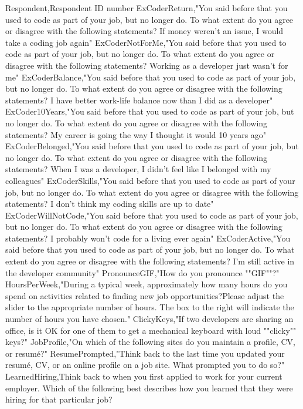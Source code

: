 \begin{appendices}
Respondent,Respondent ID number
ExCoderReturn,"You said before that you used to code as part of your job, but no longer do. To what extent do you agree or disagree with the following statements? If money weren't an issue, I would take a coding job again"
ExCoderNotForMe,"You said before that you used to code as part of your job, but no longer do. To what extent do you agree or disagree with the following statements? Working as a developer just wasn't for me"
ExCoderBalance,"You said before that you used to code as part of your job, but no longer do. To what extent do you agree or disagree with the following statements? I have better work-life balance now than I did as a developer"
ExCoder10Years,"You said before that you used to code as part of your job, but no longer do. To what extent do you agree or disagree with the following statements? My career is going the way I thought it would 10 years ago"
ExCoderBelonged,"You said before that you used to code as part of your job, but no longer do. To what extent do you agree or disagree with the following statements? When I was a developer, I didn't feel like I belonged with my colleagues"
ExCoderSkills,"You said before that you used to code as part of your job, but no longer do. To what extent do you agree or disagree with the following statements? I don't think my coding skills are up to date"
ExCoderWillNotCode,"You said before that you used to code as part of your job, but no longer do. To what extent do you agree or disagree with the following statements? I probably won't code for a living ever again"
ExCoderActive,"You said before that you used to code as part of your job, but no longer do. To what extent do you agree or disagree with the following statements? I'm still active in the developer community"
PronounceGIF,"How do you pronounce ""GIF""?"
HoursPerWeek,"During a typical week, approximately how many hours do you spend on activities related to finding new job opportunities?Please adjust the slider to the appropriate number of hours. The box to the right will indicate the number of hours you have chosen."
ClickyKeys,"If two developers are sharing an office, is it OK for one of them to get a mechanical keyboard with loud ""clicky"" keys?"
JobProfile,"On which of the following sites do you maintain a profile, CV, or resumé?"
ResumePrompted,"Think back to the last time you updated your resumé, CV, or an online profile on a job site. What prompted you to do so?"
LearnedHiring,Think back to when you first applied to work for your current employer. Which of the following best describes how you learned that they were hiring for that particular job?

\end{appendices}
